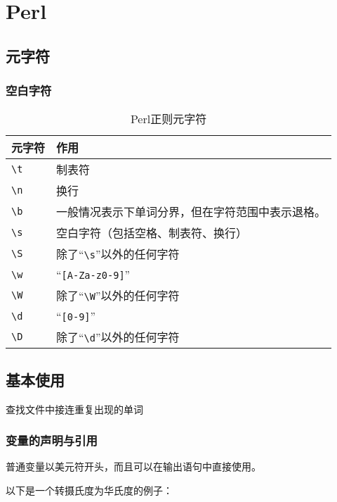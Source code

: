\chapter{Perl}

\section{元字符}

\subsection{空白字符}

\begin{table}[htbp]
	\caption{Perl正则元字符}
	\label{tab:perl.regex.meta}
	\centering
	\begin{tabular}{ll}
		\hline
		元字符 & 作用 \\
		\hline
		\verb|\t| & 制表符 \\
		\verb|\n| & 换行 \\
		\verb|\b| & 一般情况表示下单词分界，但在字符范围中表示退格。\\
		\verb|\s| & 空白字符（包括空格、制表符、换行）\\
		\verb|\S| & 除了“\verb|\s|”以外的任何字符\\
		\verb|\w| & “\verb|[A-Za-z0-9]|”\\
		\verb|\W| & 除了“\verb|\W|”以外的任何字符\\
		\verb|\d| & “\verb|[0-9]|”\\
		\verb|\D| & 除了“\verb|\d|”以外的任何字符\\
		\hline
	\end{tabular}
\end{table}



\section{基本使用}

查找文件中接连重复出现的单词



\subsection{变量的声明与引用}

普通变量以美元符开头，而且可以在输出语句中直接使用。

以下是一个转摄氏度为华氏度的例子：

